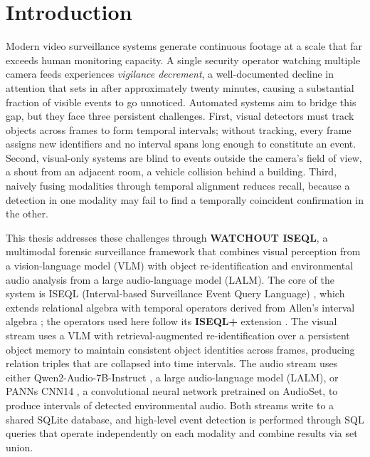 \chapter{Introduction}
\label{Introduction}

Modern video surveillance systems generate continuous footage at a scale that far exceeds human monitoring capacity. A single security operator watching multiple camera feeds experiences \textit{vigilance decrement}, a well-documented decline in attention that sets in after approximately twenty minutes, causing a substantial fraction of visible events to go unnoticed. Automated systems aim to bridge this gap, but they face three persistent challenges. First, visual detectors must track objects across frames to form temporal intervals; without tracking, every frame assigns new identifiers and no interval spans long enough to constitute an event. Second, visual-only systems are blind to events outside the camera's field of view, a shout from an adjacent room, a vehicle collision behind a building. Third, naively fusing modalities through temporal alignment reduces recall, because a detection in one modality may fail to find a temporally coincident confirmation in the other.

This thesis addresses these challenges through \textbf{WATCHOUT ISEQL}, a multimodal forensic surveillance framework that combines visual perception from a vision-language model (VLM) with object re-identification and environmental audio analysis from a large audio-language model (LALM). The core of the system is ISEQL (Interval-based Surveillance Event Query Language) \citep{helmer2016highlevel}, which extends relational algebra with temporal operators derived from Allen's interval algebra \citep{allen1983}; the operators used here follow its \textbf{ISEQL+} extension \citep{persia2026iseqlplus}. The visual stream uses a VLM with retrieval-augmented re-identification over a persistent object memory to maintain consistent object identities across frames, producing relation triples that are collapsed into time intervals. The audio stream uses either Qwen2-Audio-7B-Instruct \citep{chu2024qwen2audio}, a large audio-language model (LALM), or PANNs CNN14 \citep{kong2020panns}, a convolutional neural network pretrained on AudioSet, to produce intervals of detected environmental audio. Both streams write to a shared SQLite database, and high-level event detection is performed through SQL queries that operate independently on each modality and combine results via set union.

